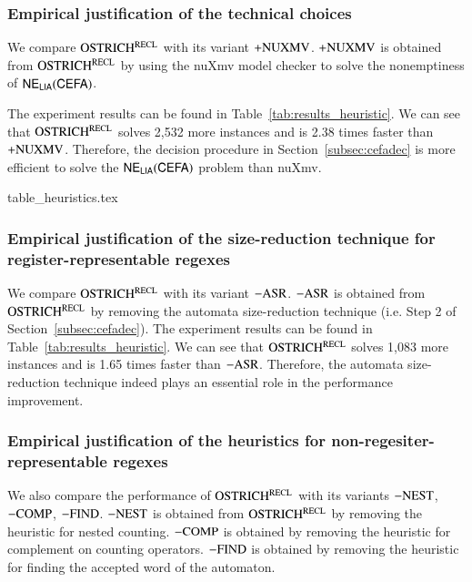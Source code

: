\subsubsection{Empirical justification of the technical choices}
We compare $\rm OSTRICH^{RECL}$ with its variant  ${\rm +NUXMV}$. ${\rm +NUXMV}$  is obtained from $\rm OSTRICH^{RECL}$ by using the nuXmv model checker to solve the nonemptiness of ${\sf NE_{LIA}(CEFA)}$. 

The experiment results can be found in Table~\ref{tab:results_heuristic}. We can see that $\rm OSTRICH^{RECL}$ solves 2,532 more instances and is 2.38 times faster than ${\rm +NUXMV}$. Therefore, the decision procedure in Section~\ref{subsec:cefadec} is more efficient to solve the ${\sf NE_{LIA}(CEFA)}$ problem than nuXmv. 
\begin{table}
  {table_heuristics.tex}
  \caption{Empirical justification of the technical choices and heuristics}\label{tab:results_heuristic}
\end{table}

\subsubsection{Empirical justification of the size-reduction technique for register-representable regexes}
We compare $\rm OSTRICH^{RECL}$ with its variant ${\rm -ASR}$.  ${\rm -ASR}$ is obtained from $\rm OSTRICH^{RECL}$ by removing the automata size-reduction technique (i.e. Step 2 of Section~\ref{subsec:cefadec}). 
The experiment results can be found in Table~\ref{tab:results_heuristic}. We can see that $\rm OSTRICH^{RECL}$ solves 1,083 more instances and is 1.65 times faster than ${\rm -ASR}$. Therefore,  the automata size-reduction technique indeed plays an essential role in the performance improvement.

\subsubsection{Empirical justification of the heuristics for non-regesiter-representable regexes} 
We also compare the performance of $\rm OSTRICH^{RECL}$ with its variants ${\rm -NEST}$, ${\rm -COMP}$, ${\rm -FIND}$. ${\rm -NEST}$ is obtained from $\rm OSTRICH^{RECL}$ by removing the heuristic for nested counting. ${\rm -COMP}$ is obtained by removing the heuristic for complement on counting operators. ${\rm -FIND}$ is obtained by removing the heuristic for finding the accepted word of the automaton.

